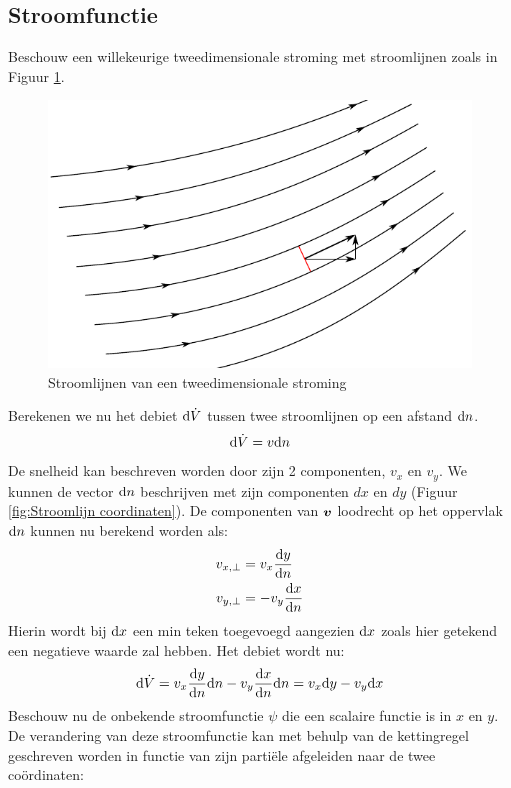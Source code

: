 		\subsection{Stroomfunctie}
Beschouw een willekeurige tweedimensionale stroming met stroomlijnen zoals in Figuur \ref{fig:Stroomfunctie}.
\begin{figure}[htb]
	\centering
	\includegraphics{fig/uitwendige_stroming/Stroomfunctie}
	\caption{Stroomlijnen van een tweedimensionale stroming}
	\label{fig:Stroomfunctie}
\end{figure}
Berekenen we nu het debiet $\mathrm{d} \dot{V}$ tussen twee stroomlijnen op een afstand $\mathrm{d} n$.
\begin{equation}
	\mathrm{d} \dot{V} = v \mathrm{d} n
\end{equation}
De snelheid kan beschreven worden door zijn 2 componenten, $v_x$ en $v_y$. We kunnen de vector $\mathrm{d} n$ beschrijven met zijn componenten $dx$ en $dy$ (Figuur \ref{fig:Stroomlijn coordinaten}). De componenten van $\boldsymbol{v}$ loodrecht op het oppervlak $\mathrm{d} n$ kunnen nu berekend worden als:
\begin{align}
	v_{x,\perp} &=  v_x \frac{\mathrm{d} y}{\mathrm{d} n} \\
	v_{y,\perp} &= -v_y \frac{\mathrm{d} x}{\mathrm{d} n}
\end{align}
Hierin wordt bij $\mathrm{d} x$ een min teken toegevoegd aangezien $\mathrm{d} x$ zoals hier getekend een negatieve waarde zal hebben. Het debiet wordt nu:
\begin{equation}
	\mathrm{d} \dot{V} = v_x \frac{\mathrm{d} y}{\mathrm{d} n} \mathrm{d} n - v_y \frac{\mathrm{d} x}{\mathrm{d} n} \mathrm{d} n = v_x \mathrm{d} y - v_y \mathrm{d} x
	\label{eqn:debiet tussen stroomlijnen}
\end{equation}
Beschouw nu de onbekende stroomfunctie $\psi$ die een scalaire functie is in $x$ en $y$. De verandering van deze stroomfunctie kan met behulp van de kettingregel geschreven worden in functie van zijn partiële afgeleiden naar de twee coördinaten:
